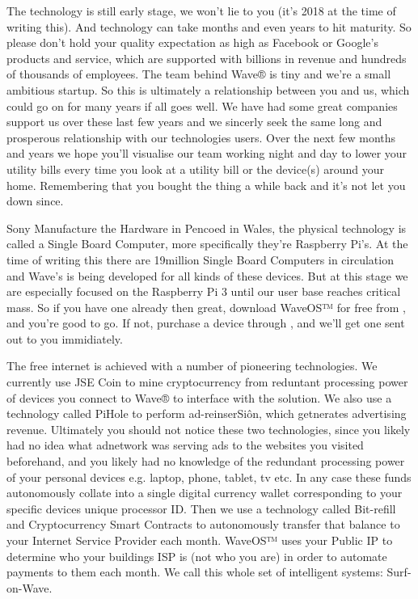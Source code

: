 \documentclass[letterpaper,10pt,openany,oneside,english]{sphinxmanual}
\begin{document}
The technology is still early stage, we won’t lie to you (it’s 2018 at the time of writing this). And technology can take months and even years to hit maturity. So please don’t hold your quality expectation as high as Facebook or Google’s products and service, which are supported with billions in revenue and hundreds of thousands of employees. The team behind Wave® is tiny and we’re a small ambitious startup. So this is ultimately a relationship between you and us, which could go on for many years if all goes well. We have had some great companies support us over these last few years and we sincerly seek the same long and prosperous relationship with our technologies users. Over the next few months and years we hope you’ll visualise our team working night and day to lower your utility bills every time you look at a utility bill or the device(s) around your home. Remembering that you bought the thing a while back and it’s not let you down since.

Sony Manufacture the Hardware in Pencoed in Wales, the physical technology is called a Single Board Computer, more specifically they’re Raspberry Pi’s. At the time of writing this there are 19million Single Board Computers in circulation and Wave’s is being developed for all kinds of these devices. But at this stage we are especially focused on the Raspberry Pi 3 until our user base reaches critical mass. So if you have one already then great, download WaveOS™ for free from , and you’re good to go. If not, purchase a device through , and we’ll get one sent out to you immidiately.

The free internet is achieved with a number of pioneering technologies. We currently use JSE Coin to mine cryptocurrency from reduntant processing power of devices you connect to Wave® to interface with the solution. We also use a technology called PiHole to perform ad-reinserSiôn, which getnerates advertising revenue. Ultimately you should not notice these two technologies, since you likely had no idea what adnetwork was serving ads to the websites you visited beforehand, and you likely had no knowledge of the redundant processing power of your personal devices e.g. laptop, phone, tablet, tv etc. In any case these funds autonomously collate into a single digital currency wallet corresponding to your specific devices unique processor ID. Then we use a technology called Bit-refill and Cryptocurrency Smart Contracts to autonomously transfer that balance to your Internet Service Provider each month. WaveOS™ uses your Public IP to determine who your buildings ISP is (not who you are) in order to automate payments to them each month. We call this whole set of intelligent systems: Surf-on-Wave.
\end{document}
